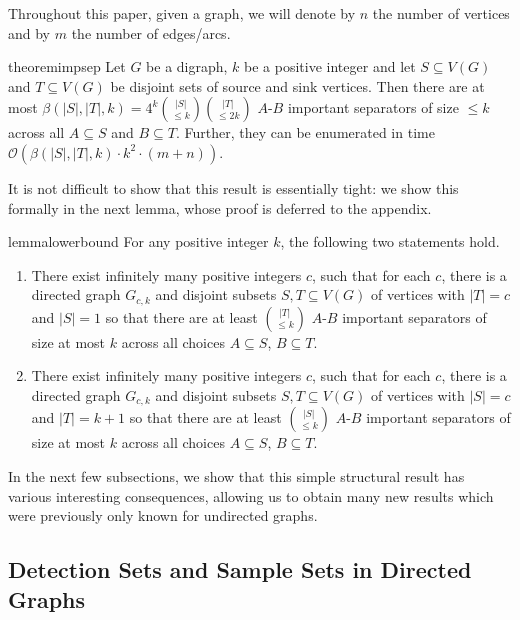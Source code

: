 \documentclass[11pt]{article}
\newcommand{\OO}{\mathcal{O}}
\begin{document}
Throughout this paper, given a graph, we will denote by $n$ the number of vertices and by $m$ the number of edges/arcs. 

\begin{restatable}{theorem}{impsep}\label{thm:importantbound}
Let $G$ be a digraph, $k$ be a positive integer and let $S \subseteq V(G)$ and $T \subseteq V(G)$ be disjoint sets of source and sink vertices. Then there are at most $ \beta(|S|, |T|, k) = 4^k {|S| \choose \leq k}{|T| \choose \leq 2k}$ $A$-$B$ important separators of size $\leq k$ across all $A \subseteq S$ and $B \subseteq T$. Further, they can be enumerated in time $\OO(\beta(|S|, |T|, k)\cdot k^2\cdot(m + n))$. 
\end{restatable}


It is not difficult to show that this result is essentially tight: we show this formally in the next lemma, whose proof is deferred to the appendix. 

\begin{restatable}{lemma}{lowerbound}
For any positive integer $k$, the following two statements hold.
\begin{enumerate}
\item There exist infinitely many positive integers $c$, such that for each $c$, there is a directed graph $G_{c,k}$ and disjoint subsets $S, T \subseteq V(G)$ of vertices with $|T| = c$ and $|S| = 1$ so that there are at least ${|T| \choose \leq k}$ $A$-$B$ important separators of size at most $k$ across all choices $A \subseteq S$, $B \subseteq T$.

\item There exist infinitely many positive integers $c$, such that for each $c$, there is a directed graph $G_{c,k}$ and disjoint subsets $S,T \subseteq V(G)$ of vertices with $|S| = c$ and $|T| = k + 1$ so that there are at least ${|S| \choose \leq k}$ $A$-$B$ important separators of size at most $k$ across all choices $A \subseteq S$, $B \subseteq T$.

\end{enumerate}
\end{restatable}

In  the next few subsections, we show that this simple structural result has various interesting consequences, allowing us to obtain many new results which were previously only known for undirected graphs. 

\subsection{Detection Sets and Sample Sets in Directed Graphs} 
\end{document}
